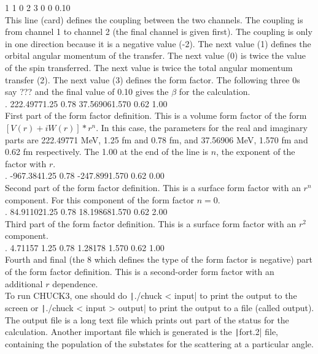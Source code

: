 \documentclass[a4paper,10pt]{article}
\begin{document}
  1  1  0  2  3  0  0 0.10\\
This line (card) defines the coupling between the two channels. The coupling is from channel 1 to channel 2 (the final channel is given first). The coupling is only in one direction because it is a negative value (-2). The next value (1) defines the orbital angular momentum of the transfer. The next value (0) is twice the value of the spin transferred. The next value is twice the total angular momentum transfer (2). The next value (3) defines the form factor. The following three 0s say ??? and the final value of 0.10 gives the $\beta$ for the calculation. \\
 
.      222.49771.25    0.78            37.569061.570   0.62            1.00\\
First part of the form factor definition. This is a volume form factor of the form $[V(r) + iW(r)] * r^n$. In this case, the parameters for the real and imaginary parts are 222.49771 MeV, 1.25 fm and 0.78 fm, and 37.56906 MeV, 1.570 fm and 0.62 fm respectively. The 1.00 at the end of the line is $n$, the exponent of the factor with $r$.\\

.      -967.3841.25    0.78            -247.8991.570   0.62            0.00\\
Second part of the form factor definition. This is a surface form factor with an $r^n$ component. For this component of the form factor $n=0$.\\

.      84.911021.25    0.78            18.198681.570   0.62            2.00\\
Third part of the form factor definition. This is a surface form factor with an $r^2$ component.\\

.     4.71157 1.25    0.78            1.28178 1.570   0.62            1.00\\
Fourth and final (the 8 which defines the type of the form factor is negative) part of the form factor definition. This is a second-order form factor with an additional $r$ dependence.\\

To run CHUCK3, one should do \texttt|./chuck < input| to print the output to the screen or \texttt|./chuck < input > output| to print the output to a file (called output). The output file is a long text file which prints out part of the status for the calculation. Another important file which is generated is the \texttt|fort.2| file, containing the population of the substates for the scattering at a particular angle.
\end{document}
